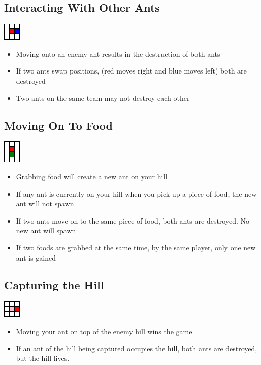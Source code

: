 \documentclass{article}
\begin{document}
\subsection{Interacting With Other Ants}
\begin{center}
\includegraphics{fight.png}
\end{center}
\begin{itemize}
  \item Moving onto an enemy ant results in the destruction of both ants
  \item If two ants swap positions, (red moves right and blue moves left) both are destroyed
  \item Two ants on the same team may not destroy each other
\end{itemize}

\subsection{Moving On To Food}
\begin{center}
\includegraphics{foodGrab.png}
\end{center}
\begin{itemize}
  \item Grabbing food will create a new ant on your hill
  \item If any ant is currently on your hill when you pick up a piece of food, the new ant will not spawn
  \item If two ants move on to the same piece of food, both ants are destroyed. No new ant will spawn
  \item If two foods are grabbed at the same time, by the same player, only one new ant is gained
\end{itemize}

\subsection{Capturing the Hill}
\begin{center}
\includegraphics{hillCapture.png}
\end{center}
\begin{itemize}
  \item Moving your ant on top of the enemy hill wins the game
  \item If an ant of the hill being captured occupies the hill, both ants are destroyed, but the hill lives. 
\end{itemize}
\end{document}
